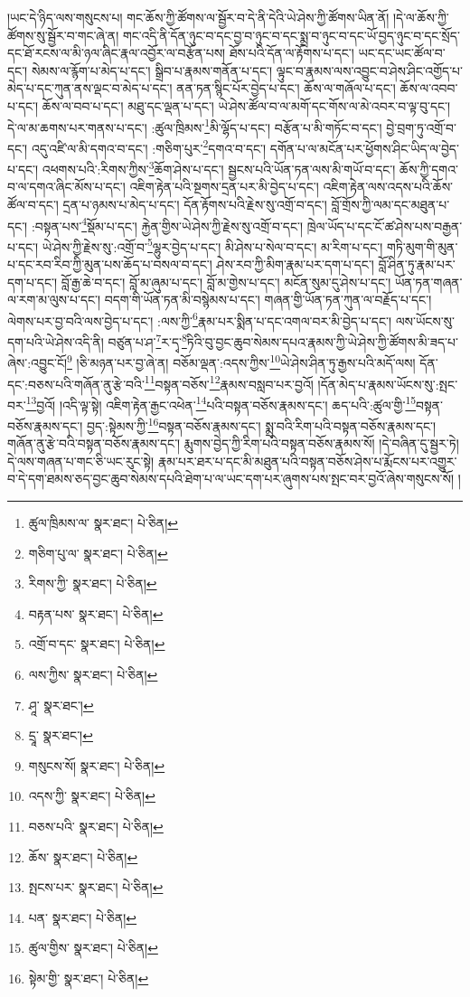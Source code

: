 །ཡང་དེ་ཉིད་ལས་གསུངས་པ། གང་ཆོས་ཀྱི་ཚོགས་ལ་སྦྱོར་བ་དེ་ནི་དེའི་ཡེ་ཤེས་ཀྱི་ཚོགས་ཡིན་ནོ། །དེ་ལ་ཆོས་ཀྱི་ཚོགས་སུ་སྦྱོར་བ་གང་ཞེ་ན། གང་འདི་ནི་དོན་ཉུང་བ་དང་བྱ་བ་ཉུང་བ་དང་སྨྲ་བ་ཉུང་བ་དང་ཡོ་བྱད་ཉུང་བ་དང་སྲོད་དང་ཐོ་རངས་ལ་མི་ཉལ་ཞིང་རྣལ་འབྱོར་ལ་བརྩོན་པས། ཐོས་པའི་དོན་ལ་རྟོགས་པ་དང་། ཡང་དང་ཡང་ཚོལ་བ་དང་། སེམས་ལ་རྙོག་པ་མེད་པ་དང་། སྒྲིབ་པ་རྣམས་གནོན་པ་དང་། ལྟུང་བ་རྣམས་ལས་འབྱུང་བ་ཤེས་ཤིང་འགྱོད་པ་མེད་པ་དང་ཀུན་ནས་ལྡང་བ་མེད་པ་དང་། ནན་ཏན་སྙིང་པོར་བྱེད་པ་དང་། ཆོས་ལ་གཞོལ་པ་དང་། ཆོས་ལ་འབབ་པ་དང་། ཆོས་ལ་བབ་པ་དང་། མཐུ་དང་ལྡན་པ་དང་། ཡེ་ཤེས་ཚོལ་བ་ལ་མགོ་དང་གོས་ལ་མེ་འབར་བ་ལྟ་བུ་དང་། དེ་ལ་མ་ཆགས་པར་གནས་པ་དང་། :ཚུལ་ཁྲིམས་\footnote{ཚུལ་ཁྲིམས་ལ་  སྣར་ཐང་།  པེ་ཅིན། }མི་ལྷོད་པ་དང་། བརྩོན་པ་མི་གཏོང་བ་དང་། བྱེ་བྲག་ཏུ་འགྲོ་བ་དང་། འདུ་འཛི་ལ་མི་དགའ་བ་དང་། :གཅིག་པུར་\footnote{གཅིག་པུ་ལ་  སྣར་ཐང་།  པེ་ཅིན། }དགའ་བ་དང་། དགོན་པ་ལ་མངོན་པར་ཕྱོགས་ཤིང་ཡིད་ལ་བྱེད་པ་དང་། འཕགས་པའི་:རིགས་ཀྱིས་\footnote{རིགས་ཀྱི་  སྣར་ཐང་།  པེ་ཅིན། }ཆོག་ཤེས་པ་དང་། སྦྱངས་པའི་ཡོན་ཏན་ལས་མི་གཡོ་བ་དང་། ཆོས་ཀྱི་དགའ་བ་ལ་དགའ་ཞིང་མོས་པ་དང་། འཇིག་རྟེན་པའི་སྔགས་དྲན་པར་མི་བྱེད་པ་དང་། འཇིག་རྟེན་ལས་འདས་པའི་ཆོས་ཚོལ་བ་དང་། དྲན་པ་ཉམས་པ་མེད་པ་དང་། དོན་རྟོགས་པའི་རྗེས་སུ་འགྲོ་བ་དང་། བློ་གྲོས་ཀྱི་ལམ་དང་མཐུན་པ་དང་། :བསྟན་པས་\footnote{བརྟན་པས་  སྣར་ཐང་།  པེ་ཅིན། }སྡོམ་པ་དང་། རྐྱེན་གྱིས་ཡེ་ཤེས་ཀྱི་རྗེས་སུ་འགྲོ་བ་དང་། ཁྲེལ་ཡོད་པ་དང་ངོ་ཚ་ཤེས་པས་བརྒྱན་པ་དང་། ཡེ་ཤེས་ཀྱི་རྗེས་སུ་:འགྲོ་བ་\footnote{འགྲོ་བ་དང་  སྣར་ཐང་།  པེ་ཅིན། }ལྷུར་བྱེད་པ་དང་། མི་ཤེས་པ་སེལ་བ་དང་། མ་རིག་པ་དང་། གཏི་མུག་གི་མུན་པ་དང་རབ་རིབ་ཀྱི་མུན་པས་ཆོད་པ་བསལ་བ་དང་། ཤེས་རབ་ཀྱི་མིག་རྣམ་པར་དག་པ་དང་། བློ་ཤིན་ཏུ་རྣམ་པར་དག་པ་དང་། བློ་རྒྱ་ཆེ་བ་དང་། བློ་མ་ཞུམ་པ་དང་། བློ་མ་གྱེས་པ་དང་། མངོན་སུམ་དུ་ཤེས་པ་དང་། ཡོན་ཏན་གཞན་ལ་རག་མ་ལུས་པ་དང་། བདག་གི་ཡོན་ཏན་མི་བསྙེམས་པ་དང་། གཞན་གྱི་ཡོན་ཏན་ཀུན་ལ་བརྗོད་པ་དང་། ལེགས་པར་བྱ་བའི་ལས་བྱེད་པ་དང་། :ལས་ཀྱི་\footnote{ལས་ཀྱིས་  སྣར་ཐང་།  པེ་ཅིན། }རྣམ་པར་སྨིན་པ་དང་འགལ་བར་མི་བྱེད་པ་དང་། ལས་ཡོངས་སུ་དག་པའི་ཡེ་ཤེས་འདི་ནི། བཙུན་པ་ཤ་\footnote{ཤཱ་  སྣར་ཐང་། }ར་དྭ་\footnote{དྲཱ་  སྣར་ཐང་། }ཏིའི་བུ་བྱང་ཆུབ་སེམས་དཔའ་རྣམས་ཀྱི་ཡེ་ཤེས་ཀྱི་ཚོགས་མི་ཟད་པ་ཞེས་:འབྱུང་ངོ།\footnote{གསུངས་སོ།  སྣར་ཐང་།  པེ་ཅིན། } །ཅི་མཉན་པར་བྱ་ཞེ་ན། བཅོམ་ལྡན་:འདས་ཀྱིས་\footnote{འདས་ཀྱི་  སྣར་ཐང་།  པེ་ཅིན། }ཡེ་ཤེས་ཤིན་ཏུ་རྒྱས་པའི་མདོ་ལས། དོན་དང་:བཅས་པའི་གཞོན་ནུ་རྩེ་བའི་\footnote{བཅས་པའི་  སྣར་ཐང་།  པེ་ཅིན། }བསྟན་བཅོས་\footnote{ཆོས་  སྣར་ཐང་།  པེ་ཅིན། }རྣམས་བསླབ་པར་བྱའོ། །དོན་མེད་པ་རྣམས་ཡོངས་སུ་:སྤང་བར་\footnote{སྤངས་པར་  སྣར་ཐང་།  པེ་ཅིན། }བྱའོ། །འདི་ལྟ་སྟེ། འཇིག་རྟེན་རྒྱང་འཕེན་\footnote{པན་  སྣར་ཐང་།  པེ་ཅིན། }པའི་བསྟན་བཅོས་རྣམས་དང་། ཆད་པའི་:ཚུལ་གྱི་\footnote{ཚུལ་གྱིས་  སྣར་ཐང་།  པེ་ཅིན། }བསྟན་བཅོས་རྣམས་དང་། བྱད་:སྟེམས་ཀྱི་\footnote{སྟེམ་གྱི་  སྣར་ཐང་།  པེ་ཅིན། }བསྟན་བཅོས་རྣམས་དང་། སྨྲ་བའི་རིག་པའི་བསྟན་བཅོས་རྣམས་དང་། གཞོན་ནུ་རྩེ་བའི་བསྟན་བཅོས་རྣམས་དང་། རྨུགས་བྱེད་ཀྱི་རིག་པའི་བསྟན་བཅོས་རྣམས་སོ། །དེ་བཞིན་དུ་སྦྱར་ཏེ། དེ་ལས་གཞན་པ་གང་ཅི་ཡང་རུང་སྟེ། རྣམ་པར་ཐར་པ་དང་མི་མཐུན་པའི་བསྟན་བཅོས་ཤེས་པ་རྨོངས་པར་འགྱུར་བ་དེ་དག་ཐམས་ཅད་བྱང་ཆུབ་སེམས་དཔའི་ཐེག་པ་ལ་ཡང་དག་པར་ཞུགས་པས་སྤང་བར་བྱའོ་ཞེས་གསུངས་སོ། །
